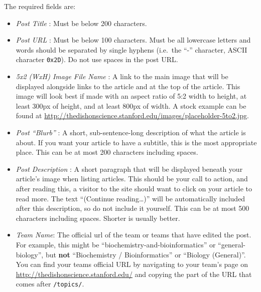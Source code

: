 \documentclass[paper=a4, fontsize=11pt]{scrartcl}
\numberwithin{equation}{section}        %
\numberwithin{figure}{section}            %
\numberwithin{table}{section}                %
\newcommand{\dishurlplain}[1]{http://thedishonscience.stanford.edu/#1}
\newcommand{\dishurl}[1]{\url{\dishurlplain{#1}}}
\begin{document}
\noindent{}The required fields are:\@
\begin{itemize}
    \item \emph{Post Title} : Must be below 200 characters.
    \item \emph{Post URL} : Must be below 100 characters.
        Must be all lowercase letters and words should be separated by single
        hyphens (i.e.\ the ``-'' character, ASCII character \texttt{0x2D}). Do
        not use spaces in the post URL.
    \item \emph{5x2 (WxH) Image File Name} : A link to the main image that will be
        displayed alongside links to the article and at the top of the article.
        This image will look best if made with an aspect ratio of 5:2 width to
        height, at least 300px of height, and at least 800px of width. A stock
        example can be found at \dishurl{images/placeholder-5to2.jpg}.
    \item \emph{Post ``Blurb''} : A short, sub-sentence-long description of what
        the article is about. If you want your article to have a subtitle, this
        is the most appropriate place. This can be at most 200 characters
        including spaces.
    \item \emph{Post Description} : A short paragraph that will be displayed
        beneath your article's image when listing articles. This should be your
        call to action, and after reading this, a visitor to the site should
        want to click on your article to read more. The text ``(Continue
        reading\ldots{})'' will be automatically included after this description, so do
        not include it yourself. This can be at most 500 characters including
        spaces. Shorter is usually better.
    \item \emph{Team Name}: The official url of the team or teams that have edited the
        post. For example, this might be ``biochemistry-and-bioinformatics'' or
        ``general-biology'', but \textbf{not} ``Biochemistry / Bioinformatics'' or
        ``Biology (General)''. You can find your teams official URL by navigating
        to your team's page on \dishurl{} and copying the part of the URL
        that comes after \texttt{/topics/}.
\end{itemize}
\end{document}
